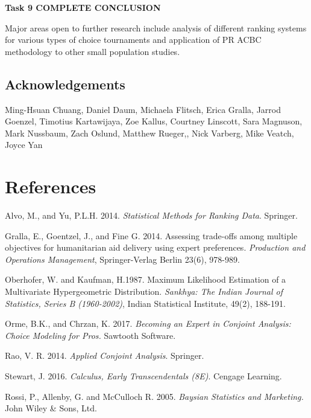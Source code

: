 \documentclass[a4paper, 12pt]{article}
\begin{document}
{\bf Task 9 COMPLETE CONCLUSION}

Major areas open to further research include analysis of  different ranking systems for various types of choice tournaments and application of PR ACBC methodology to other small population studies.



\subsection*{Acknowledgements}

Ming-Hsuan Chuang,
Daniel Daum, Michaela Flitsch, Erica Gralla, Jarrod Goenzel, Timotius Kartawijaya, Zoe Kallus, Courtney Linscott, Sara Magnuson, Mark Nussbaum, Zach Oslund, Matthew Rueger,, Nick Varberg, Mike Veatch, Joyce Yan   

\section*{References}
\begin{list}{}{\itemindent=-2em}
\small
\item Alvo, M., and Yu, P.L.H. 2014. \emph{Statistical Methods for Ranking Data}. Springer.

\item Gralla, E., Goentzel, J., and Fine G. 2014. Assessing trade-offs among multiple objectives for humanitarian aid delivery using expert preferences.
\emph{Production and Operations Management}, Springer-Verlag Berlin 23(6), 978-989.

\item Oberhofer, W. and Kaufman, H.1987.  Maximum Likelihood Estimation of a Multivariate Hypergeometric Distribution. \emph{Sankhya: The Indian Journal of Statistics, Series B (1960-2002)}, Indian Statistical Institute, 49(2), 188-191. 

\item Orme, B.K., and Chrzan, K. 2017. \emph{Becoming an Expert in Conjoint Analysis: Choice Modeling for Pros.} Sawtooth Software.

\item Rao, V. R. 2014. \emph{Applied Conjoint Analysis}. Springer.

\item  Stewart, J. 2016.  \emph{Calculus, Early Transcendentals (8E)}. Cengage Learning.

\item Rossi, P., Allenby, G. and McCulloch R. 2005. \emph{Baysian Statistics and Marketing.} John Wiley \& Sons, Ltd.


\end{list}
\end{document}
